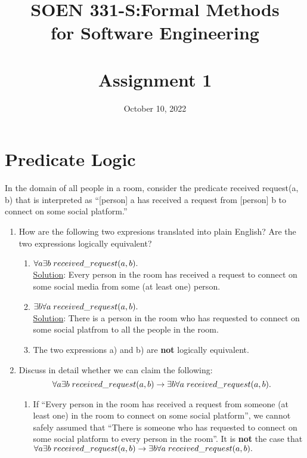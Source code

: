 \documentclass[12pt]{article}
\title{SOEN 331-S:Formal Methods\\for Software Engineering\\
\ \\
Assignment 1}
\author{}
\date{October 10, 2022}
\begin{document}
\maketitle



\newpage
\section{Predicate Logic}


\noindent In the domain of all people in a room, consider the predicate received request(a, b) that is
interpreted as ``[person] a has received a request from [person] b to connect on some social platform.''
\begin{enumerate}
      \item How are the following two expresions translated into plain English? Are the two expressions logically equivalent?
            \begin{enumerate} [label=\alph*)]
                  \item \( \forall a \exists b \hspace{1mm} received\_request(a,b). \)\\
                        \noindent \underline{Solution}: Every person in the room has received a request to connect on some social media from some (at least one) person.
                  \item \(\exists b \forall a \hspace{1mm} received\_request(a,b).\)\\
                        \noindent \underline{Solution}: There is a person in the room who has requested to connect on some social platfrom to all the people in the room.
                  \item The two expressions a) and b) are {\bf not} logically equivalent.
            \end{enumerate}

      \item Discuss in detail whether we can claim the following:
            \[\forall a \exists b \hspace{1mm} received\_request(a,b) \rightarrow \exists b \forall a \hspace{1mm} received\_request(a,b).\]
            \begin{enumerate} [label=\roman*)]
                  \item If ``Every person in the room has received a request from someone (at least one) in the room to connect on some social platform'',
                        \noindent we cannot safely assumed that ``There is someone who has requested to connect on some social platform to every person in the room''.
                        \noindent It is {\bf not} the case that \(\forall a \exists b \hspace{1mm} received\_request(a,b) \rightarrow \exists b \forall a \hspace{1mm} received\_request(a,b).\)


\end{enumerate}
\end{enumerate}
\end{document}
